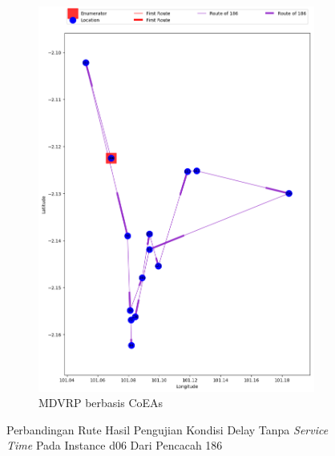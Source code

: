\begin{figure}[H]
	\centering
	\begin{subfigure}[t]{\textwidth}
		\centering
		\includegraphics[width=\textwidth]{Resources/Images/delayed_6/real_m15_n100_delayed_6_186_coes}
		\caption{MDVRP berbasis CoEAs}
		\label{fig:real_m15_n100_delayed_6_186_coes}
	\end{subfigure}
	\caption{Perbandingan Rute Hasil Pengujian Kondisi Delay Tanpa \textit{Service Time} Pada Instance d06 Dari Pencacah 186}
	\label{fig:real_m15_n100_delayed_6_186}
\end{figure}


